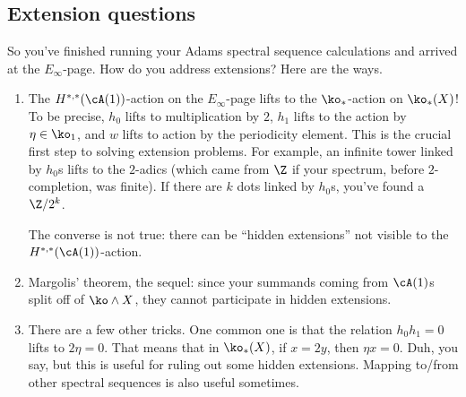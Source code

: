 \subsection{Extension questions}
So you've finished running your Adams spectral sequence calculations and arrived at the $E_\infty$-page. How do you
address extensions? Here are the ways.
\begin{enumerate}
	\item The $H^{*,*}(\cA(1))$-action on the $E_\infty$-page lifts to the $\ko_*$-action on $\ko_*(X)$! To be
	precise, $h_0$ lifts to multiplication by $2$, $h_1$ lifts to the action by $\eta\in\ko_1$, and $w$ lifts to
	action by the periodicity element. This is the crucial first step to solving extension problems. For example,
	an infinite tower linked by $h_0$s lifts to the $2$-adics (which came from $\Z$ if your spectrum, before
	$2$-completion, was finite). If there are $k$ dots linked by $h_0$s, you've found a $\Z/2^k$.

	The converse is not true: there can be ``hidden extensions'' not visible to the $H^{*,*}(\cA(1))$-action.
	\item Margolis' theorem, the sequel: since your summands coming from $\cA(1)$s split off of $\ko\wedge X$, they
	cannot participate in hidden extensions.
	\item There are a few other tricks. One common one is that the relation $h_0h_1 = 0$ lifts to $2\eta = 0$. That
	means that in $\ko_*(X)$, if $x = 2y$, then $\eta x = 0$. Duh, you say, but this is useful for ruling out some
	hidden extensions. Mapping to/from other spectral sequences is also useful sometimes.
\end{enumerate}

\begin{rem}[Variants]
\end{rem}
